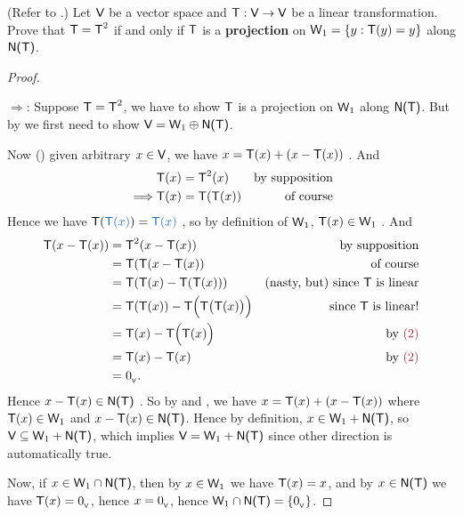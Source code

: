 \begin{exercise} \label{exercise 2.3.17}
(Refer to .)
Let \(\textsf{V}\) be a vector space and \(\textsf{T} : \textsf{V} \to \textsf{V}\) be a linear transformation.
Prove that \(\textsf{T} = \textsf{T}^2\) if and only if \(\textsf{T}\) is a \textbf{projection} on \(\textsf{W}_1 = \{ y : \textsf{T}(y) = y \}\)
along \(\textsf{N(T)}\).
\end{exercise}

\begin{proof} \ 

\(\Longrightarrow\): Suppose \(\textsf{T} = \textsf{T}^2\), we have to show \(\textsf{T}\) is a projection on \(\textsf{W}_1\) along \(\textsf{N(T)}\).
But by  we first need to show \(\textsf{V} = \textsf{W}_1 \oplus \textsf{N(T)}\).

Now () given arbitrary \(x \in \textsf{V}\), we have \(x = \textsf{T}(x) + (x - \textsf{T}(x))\) .
And
\begin{align*}
             & \textsf{T}(x) = \textsf{T}^2(x) & \text{by supposition} \\
    \implies & \textsf{T}(x) = \textsf{T}(\textsf{T}(x)) & \text{of course}
\end{align*}
Hence we have \(\T(\BLUE{\T(x)}) = \BLUE{\T(x)}\) , so by definition of \(\textsf{W}_1\), \(\textsf{T}(x) \in \textsf{W}_1\) .
And
\begin{align*}
        \T(x - \T(x)) & = \T^2(x - \T(x)) & \text{by supposition} \\
                      & = \T(\T(x - \T(x)) & \text{of course} \\
                      & = \T(\T(x) - \T(\T(x))) & \text{(nasty, but) since \(\T\) is linear} \\
                      & = \T(\T(x)) - \T\Big( \T \big( \T(x) \big) \Big) & \text{since \(\T\) is linear!} \\
                      & = \T(x) - \T\Big( \T(x) \Big) & \text{by \MAROON{(2)}} \\
                      & = \T(x) - \T(x) & \text{by \MAROON{(2)}} \\
                      & = \OV.
\end{align*}
Hence \(x - \textsf{T}(x) \in \textsf{N(T)}\) .
So by  and , we have \(x = \textsf{T}(x) + (x - \textsf{T}(x))\) where \(\textsf{T}(x) \in \textsf{W}_1\) and \(x - \textsf{T}(x) \in \textsf{N(T)}\).
Hence by definition, \(x \in \textsf{W}_1 + \textsf{N(T)}\), so \(\textsf{V} \subseteq \textsf{W}_1 + \textsf{N(T)}\), which implies \(\textsf{V} = \textsf{W}_1 + \textsf{N(T)}\) since other direction is automatically true.

Now, if \(x \in \textsf{W}_1 \cap \textsf{N(T)}\), then by \(x \in \textsf{W}_1\) we have \(\textsf{T}(x) = x\),
and by \(x \in \textsf{N(T)}\) we have \(\textsf{T}(x) = 0_{_{\textsf{V}}}\), hence \(x = 0_{_{\textsf{V}}}\), hence \(\textsf{W}_1 \cap \textsf{N(T)} = \{ 0_{_{\textsf{V}}} \}\).


\end{proof}
